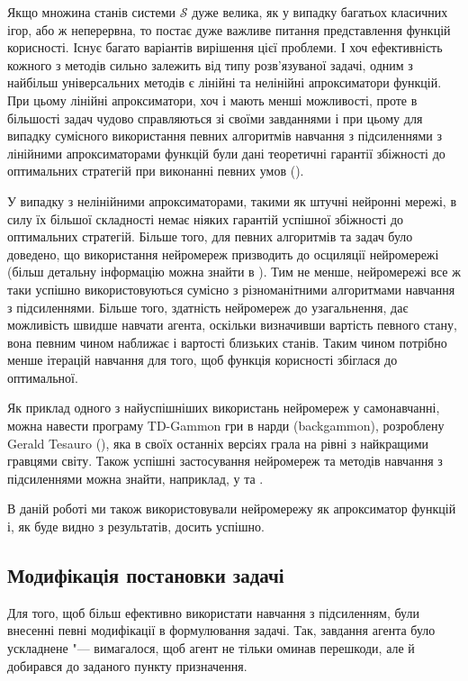\documentclass[a4paper,12pt]{article}
\begin{document}
Якщо множина станів системи $\mathcal{S}$ дуже велика, як у випадку багатьох класичних ігор, або ж неперервна, то постає дуже важливе питання представлення функцій корисності. Існує багато варіантів вирішення цієї проблеми. І хоч ефективність кожного з методів сильно залежить від типу розв'язуваної задачі, одним з найбільш універсальних методів є лінійні та нелінійні апроксиматори функцій. При цьому лінійні апроксиматори, хоч і мають менші можливості, проте в більшості задач чудово справляються зі своїми завданнями і при цьому для випадку сумісного використання певних алгоритмів навчання з підсиленнями з лінійними апроксиматорами функцій були дані теоретичні гарантії збіжності до оптимальних стратегій при виконанні певних умов (\cite{Coulom2002}).

У випадку з нелінійними апроксиматорами, такими як штучні нейронні мережі, в силу їх більшої складності немає ніяких гарантій успішної збіжності до оптимальних стратегій. Більше того, для певних алгоритмів та задач було доведено, що використання нейромереж призводить до осциляції нейромережі (більш детальну інформацію можна знайти в \cite{SuttonBarto2002}). Тим не менше, нейромережі все ж таки успішно використовуються сумісно з різноманітними алгоритмами навчання з підсиленнями. Більше того, здатність нейромереж до узагальнення, дає можливість швидше навчати агента, оскільки визначивши вартість певного стану, вона певним чином наближає і вартості близьких станів. Таким чином потрібно менше ітерацій навчання для того, щоб функція корисності збіглася до оптимальної.

Як приклад одного з найуспішніших використань нейромереж у самонавчанні, можна навести програму TD-Gammon гри в нарди (backgammon), розроблену Gerald Tesauro (\cite{Tesauro1995}), яка в своїх останніх версіях грала на рівні з найкращими гравцями світу. Також успішні застосування нейромереж та методів навчання з підсиленнями можна знайти, наприклад, у \cite{Rummery1995} та \cite{Coulom2002}.

В даній роботі ми також використовували нейромережу як апроксиматор функцій і, як буде видно з результатів, досить успішно.

\subsection{Модифікація постановки задачі}

Для того, щоб більш ефективно використати навчання з підсиленням, були внесенні певні модифікації в формулювання задачі. Так, завдання агента було ускладнене "--- вимагалося, щоб агент не тільки оминав перешкоди, але й добирався до заданого пункту призначення.
\end{document}
